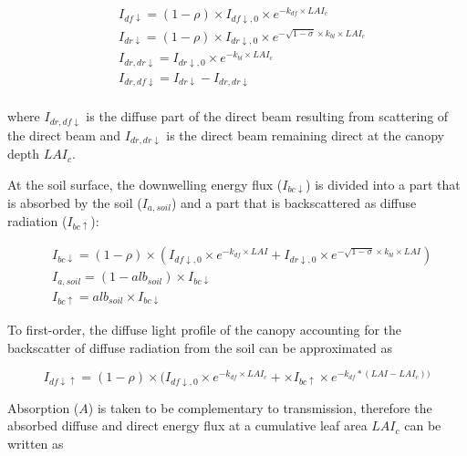 \begin{subequations}\label{eq:rad:light_profile}
\begin{align}
&I_{df \downarrow} = (1-\rho) \times I_{df \downarrow,0} \times e^{-k_{df}\times LAI_{c}}\\
&I_{dr \downarrow} = (1-\rho) \times I_{dr \downarrow,0} \times e^{-\sqrt{1-\sigma} \times k_{bl}\times LAI_{c}}\\
&I_{dr,dr \downarrow} = I_{dr \downarrow,0} \times e^{- k_{bl}\times LAI_{c}}\label{eq:rad:idrdr}\\
&I_{dr,df \downarrow} = I_{dr \downarrow} - I_{dr,dr \downarrow}\\
\end{align} 
\end{subequations} 
 
where $I_{dr,df \downarrow}$ is the diffuse part of the direct beam resulting from scattering of the direct beam and $I_{dr,dr \downarrow}$ is the direct beam remaining direct at the canopy depth $LAI_{c}$. 

At the soil surface, the downwelling energy flux ($I_{bc \downarrow}$) is divided into a part that is absorbed by the soil ($I_{a,soil}$) and a part that is backscattered as diffuse radiation ($I_{bc \uparrow}$):

\begin{subequations}\label{eq:rad:soil_netbalance}
\begin{align}
&I_{bc \downarrow} = (1-\rho) \times ( I_{df \downarrow,0} \times e^{-k_{df}\times LAI} + I_{dr \downarrow,0} \times e^{-\sqrt{1-\sigma} \times k_{bl}\times LAI})\\
&I_{a,soil} = (1-alb_{soil}) \times I_{bc \downarrow} \\
&I_{bc \uparrow} = alb_{soil} \times I_{bc \downarrow}
\end{align} 
\end{subequations} 
 
To first-order, the diffuse light profile of the canopy accounting for the backscatter of diffuse radiation from the soil can be approximated as 

\begin{equation}\label{eq:rad:omega2}
I_{df \downarrow \uparrow} = (1-\rho) \times (I_{df \downarrow,0} \times e^{-k_{df}\times LAI_{c}} + \times I_{bc \uparrow} \times e^{-k_{df}*(LAI-LAI_{c}))} 
\end{equation}

Absorption ($A$) is taken to be complementary to transmission, therefore the absorbed diffuse and direct energy flux at a cumulative leaf area $LAI_c$ can be written as 

